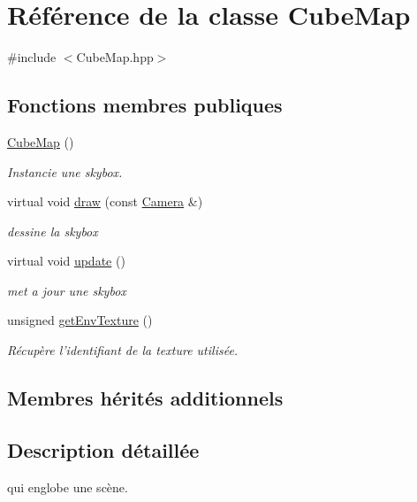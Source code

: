 \hypertarget{classCubeMap}{\section{Référence de la classe Cube\+Map}
\label{classCubeMap}
}


{\ttfamily \#include $<$Cube\+Map.\+hpp$>$}

\subsection*{Fonctions membres publiques}
\begin{DoxyCompactItemize}
\item 
\hyperlink{classCubeMap_ac33e45b385642ae69ab71e7d6842599f}{Cube\+Map} ()
\begin{DoxyCompactList}\small\item\em Instancie une skybox. \end{DoxyCompactList}\item 
virtual void \hyperlink{classCubeMap_a9e042ac0b15cf9a28af3320b769f140f}{draw} (const \hyperlink{classCamera}{Camera} \&)
\begin{DoxyCompactList}\small\item\em dessine la skybox \end{DoxyCompactList}\item 
virtual void \hyperlink{classCubeMap_af4766b5a5fafe3ce6e2cd8905b192d1c}{update} ()
\begin{DoxyCompactList}\small\item\em met a jour une skybox \end{DoxyCompactList}\item 
unsigned \hyperlink{classCubeMap_ac59d8de964ee64abd3c112cf5b62e73c}{get\+Env\+Texture} ()
\begin{DoxyCompactList}\small\item\em Récupère l'identifiant de la texture utilisée. \end{DoxyCompactList}\end{DoxyCompactItemize}
\subsection*{Membres hérités additionnels}


\subsection{Description détaillée}
qui englobe une scène. 

